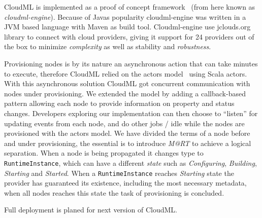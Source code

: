 CloudML is implemented as a proof of concept framework~\cite{cloudml-engine}
(from here known as \emph{cloudml-engine}). 
Because of Javas popularity cloudml-engine was written in a JVM based language with Maven as build tool.
Cloudml-engine use jclouds.org library to connect with cloud providers, giving it support
for 24 providers out of the box to minimize \emph{complexity} as well as stability and \emph{robustness}.

Provisioning nodes is by its nature an asynchronous action that can take minutes to execute,
therefore CloudML relied on the actors model~\cite{actors:haller07} using Scala actors.
With this asynchronous solution CloudML got concurrent communication with nodes under provisioning.
We extended the model by adding a callback-based pattern allowing each node to provide 
information on property and status changes.
Developers exploring our implementation can then choose to ``listen'' for updating events from each node,
and do other jobs / idle while the nodes are provisioned with the actors model.
We have divided the terms of a node before and under provisioning, the essential is to introduce 
\emph{M@RT} to achieve a logical separation.
When a node is being propagated it changes type to \texttt{RuntimeInstance}, 
which can have a different \emph{state} such as \emph{Configuring}, \emph{Building}, \emph{Starting} and \emph{Started}.
When a \texttt{RuntimeInstance} reaches \emph{Starting} state the provider has guaranteed its existence, including
the most necessary metadata, when all nodes reaches this state the task of provisioning is concluded.

Full deployment is planed for next version of CloudML.
